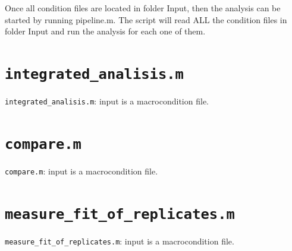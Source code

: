 \documentclass[final,letterpaper,twoside,12pt]{article}
\begin{document}
\par Once all condition files are located in folder Input, then the analysis can be started by running pipeline.m. The script will read ALL the condition files in folder Input and run the analysis for each one of them.

\section{\texttt{integrated\_analisis.m}}

\par \texttt{integrated\_analisis.m}: input is a macrocondition file.

\section{\texttt{compare.m}}

\par \texttt{compare.m}: input is a macrocondition file.

\section{\texttt{measure\_fit\_of\_replicates.m}}

\par \texttt{measure\_fit\_of\_replicates.m}: input is a macrocondition file.





\end{document}

